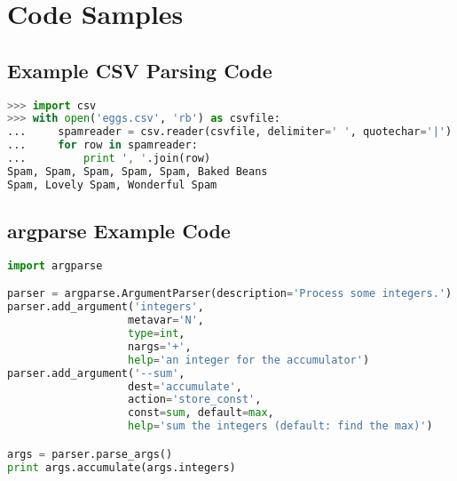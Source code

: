 \chapter{Code Samples}\label{sec:code}

\section{Example CSV Parsing Code}
\begin{lstlisting}[language=python,breaklines=true,
caption={Example CSV Parsing Code from http://docs.python.org/2/library/csv.html},
label=lst:csv_example_code, frame=single]
>>> import csv
>>> with open('eggs.csv', 'rb') as csvfile:
...     spamreader = csv.reader(csvfile, delimiter=' ', quotechar='|')
...     for row in spamreader:
...         print ', '.join(row)
Spam, Spam, Spam, Spam, Spam, Baked Beans
Spam, Lovely Spam, Wonderful Spam
\end{lstlisting}

\section{argparse Example Code}
\begin{lstlisting}[language=python,
caption={Example argparse Code from http://docs.python.org/2/library/argparse.html},
label=lst:argparse_example_code, frame=single, breaklines=true]
import argparse

parser = argparse.ArgumentParser(description='Process some integers.')
parser.add_argument('integers',
                   metavar='N',
                   type=int, 
                   nargs='+',
                   help='an integer for the accumulator')
parser.add_argument('--sum',
                   dest='accumulate',
                   action='store_const',
                   const=sum, default=max,
                   help='sum the integers (default: find the max)')

args = parser.parse_args()
print args.accumulate(args.integers)
\end{lstlisting}

